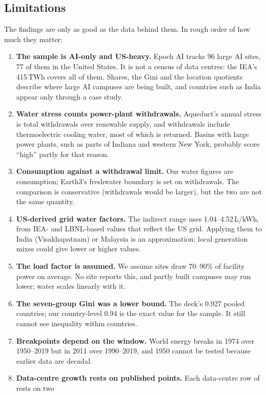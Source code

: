 \subsection{Limitations}\label{sec:limits}
The findings are only as good as the data behind them. In rough order of how much they matter:
\begin{enumerate}[leftmargin=1.3em,itemsep=1.5pt]
\item \textbf{The sample is AI-only and US-heavy.} Epoch AI tracks 96 large AI sites, 77 of them in the United States.
It is not a census of data centres: the IEA's 415\,TWh covers all of them. Shares, the Gini and the location quotients
describe where large AI campuses are being built, and countries such as India appear only through a case study.
\item \textbf{Water stress counts power-plant withdrawals.} Aqueduct's annual stress is total withdrawals over renewable
supply, and withdrawals include thermoelectric cooling water, most of which is returned. Basins with large power plants,
such as parts of Indiana and western New York, probably score ``high'' partly for that reason.
\item \textbf{Consumption against a withdrawal limit.} Our water figures are consumption; Earth3's freshwater boundary is
set on withdrawals. The comparison is conservative (withdrawals would be larger), but the two are not the same
quantity.
\item \textbf{US-derived grid water factors.} The indirect range uses 1.04--4.52\,L/kWh, from IEA- and LBNL-based values
that reflect the US grid. Applying them to India (Visakhapatnam) or Malaysia is an approximation; local generation mixes
could give lower or higher values.
\item \textbf{The load factor is assumed.} We assume sites draw 70--90\% of facility power on average. No site reports
this, and partly built campuses may run lower; water scales linearly with it.
\item \textbf{The seven-group Gini was a lower bound.} The deck's 0.927 pooled countries; our country-level 0.94 is the
exact value for the sample. It still cannot see inequality within countries.
\item \textbf{Breakpoints depend on the window.} World energy breaks in 1974 over 1950--2019 but in 2011 over
1990--2019, and 1950 cannot be tested because earlier data are decadal.
\item \textbf{Data-centre growth rests on published points.} Each data-centre row of  rests on two

\end{enumerate}
